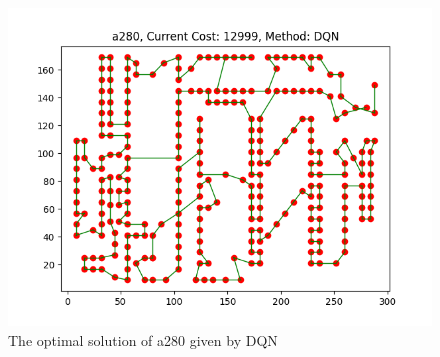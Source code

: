 \documentclass[twocolumn, a4paper]{extarticle}
\begin{document}
\begin{figure}[H]
	\centering
	\includegraphics[width=0.95\linewidth]{figure/DQN_a280}
	\caption{The optimal solution of a280 given by DQN}
	\label{fig:firea280}
\end{figure}
\end{document}
